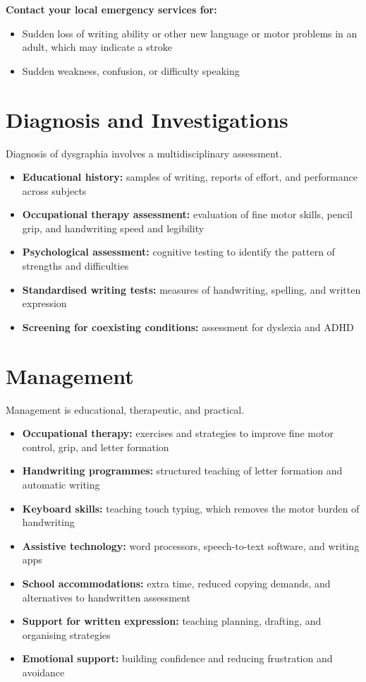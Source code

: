\textbf{Contact your local emergency services for:}
\begin{itemize}
    \item Sudden loss of writing ability or other new language or motor problems in an adult, which may indicate a stroke
    \item Sudden weakness, confusion, or difficulty speaking
\end{itemize}

\section*{Diagnosis and Investigations}
Diagnosis of dysgraphia involves a multidisciplinary assessment.
\begin{itemize}
    \item \textbf{Educational history:} samples of writing, reports of effort, and performance across subjects
    \item \textbf{Occupational therapy assessment:} evaluation of fine motor skills, pencil grip, and handwriting speed and legibility
    \item \textbf{Psychological assessment:} cognitive testing to identify the pattern of strengths and difficulties
    \item \textbf{Standardised writing tests:} measures of handwriting, spelling, and written expression
    \item \textbf{Screening for coexisting conditions:} assessment for dyslexia and ADHD
\end{itemize}

\section*{Management}
Management is educational, therapeutic, and practical.
\begin{itemize}
    \item \textbf{Occupational therapy:} exercises and strategies to improve fine motor control, grip, and letter formation
    \item \textbf{Handwriting programmes:} structured teaching of letter formation and automatic writing
    \item \textbf{Keyboard skills:} teaching touch typing, which removes the motor burden of handwriting
    \item \textbf{Assistive technology:} word processors, speech-to-text software, and writing apps
    \item \textbf{School accommodations:} extra time, reduced copying demands, and alternatives to handwritten assessment
    \item \textbf{Support for written expression:} teaching planning, drafting, and organising strategies
    \item \textbf{Emotional support:} building confidence and reducing frustration and avoidance
\end{itemize}

